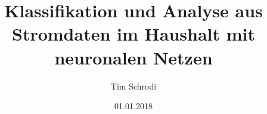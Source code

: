\documentclass[12pt, a4paper]{report}
\begin{document}
\title{Klassifikation und Analyse aus Stromdaten im Haushalt mit neuronalen
Netzen}
\author{Tim Schrodi}
\date{01.01.2018}
\maketitle

\tableofcontents












{}

\end{document}
